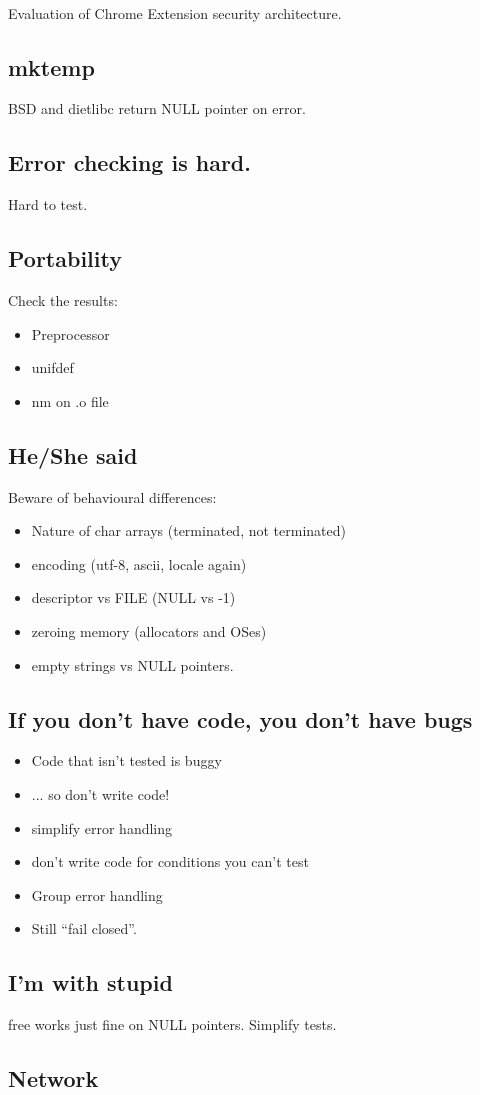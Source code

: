 \documentclass[a4paper,11pt]{article}
\newcommand{\ls}{\begin{itemize}}
\newcommand{\li}{\item}
\newcommand{\lend}{\end{itemize}}
\begin{document}
\

Evaluation of Chrome Extension security architecture.

\subsection{mktemp}

BSD and dietlibc return NULL pointer on error.

\subsection{Error checking is hard.}

Hard to test.

\subsection{Portability}

Check the results:

\ls
\li Preprocessor
\li unifdef
\li nm on .o file
\lend

\subsection{He/She said}

Beware of behavioural differences:

\ls
\li Nature of char arrays (terminated, not terminated)
\li encoding (utf-8, ascii, locale again)
\li descriptor vs FILE (NULL vs -1)
\li zeroing memory (allocators and OSes)
\li empty strings vs NULL pointers.
\lend

\subsection{If you don't have code, you don't have bugs}

\ls
\li Code that isn't tested is buggy
\li ... so don't write code!
\li simplify error handling
\li don't write code for conditions you can't test
\li Group error handling
\li Still ``fail closed''.
\lend

\subsection{I'm with stupid}

free works just fine on NULL pointers. Simplify tests.

\subsection{Network}
\end{document}
